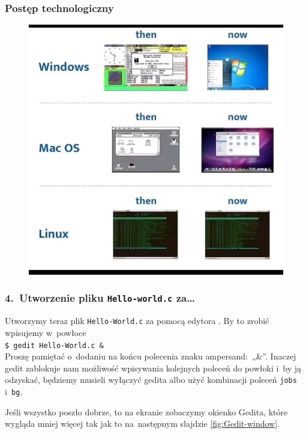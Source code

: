\documentclass[10pt,t]{beamer}
\begin{document}
\begin{frame}
  \frametitle{Postęp technologiczny}

  \vspace{-0.5em}


  \begin{figure}

    \label{fig:Evolution-of-OS}

    \centering


    \includegraphics[scale=0.3]
    {./Presentations-pictures/Evolution-of-operating-systems.jpg}

  \end{figure}

\end{frame}





\begin{frame}
  \frametitle{4.~Utworzenie pliku \texttt{Hello-world.c} za\ldots}


  Utworzymy teraz plik \texttt{Hello-World.c} za pomocą edytora
  . By to zrobić
  wpisujemy w~powłoce \\
  \texttt{\$ gedit Hello-World.c \&} \\
  Proszę pamiętać o~dodaniu na końcu polecenia znaku
  \alert{ampersand}:~„\&”. Inaczej gedit zablokuje nam możliwość wpisywania
  kolejnych poleceń do powłoki i~by ją odzyskać, będziemy musieli
  wyłączyć gedita albo użyć kombinacji poleceń \texttt{jobs} i~\texttt{bg}.

  Jeśli wszystko poszło dobrze, to na ekranie zobaczymy okienko Gedita,
  które wygląda mniej więcej tak jak to na~następnym slajdzie
  \eqref{fig:Gedit-window}.

\end{frame}
\end{document}
